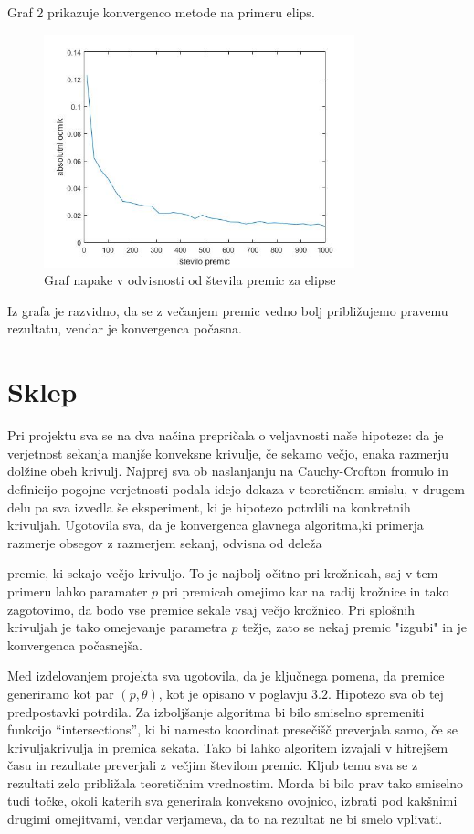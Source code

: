 \documentclass[a4paper]{article}
\begin{document}
Graf 2 prikazuje konvergenco metode na primeru elips.

\begin{figure}[h]
\centering
\includegraphics[width=90mm]{graf_elipsa2.jpg}
\caption{Graf napake v odvisnosti od števila premic za elipse \label{overflow}}
\end{figure} 


Iz grafa je razvidno, da se z večanjem premic vedno bolj približujemo pravemu rezultatu, vendar je konvergenca počasna. 

\section{Sklep}
Pri projektu sva se na dva načina prepričala o veljavnosti naše hipoteze: da je verjetnost sekanja manjše konveksne krivulje, če sekamo večjo, enaka razmerju dolžine obeh krivulj. Najprej sva ob naslanjanju na Cauchy-Crofton fromulo in definicijo pogojne verjetnosti podala idejo dokaza v teoretičnem smislu, v drugem delu pa sva izvedla še eksperiment, ki je hipotezo potrdili na konkretnih krivuljah. 
Ugotovila sva, da je konvergenca glavnega algoritma,ki primerja razmerje obsegov z razmerjem sekanj, odvisna od deleža

premic, ki sekajo večjo krivuljo. To je najbolj očitno pri krožnicah, saj v tem primeru lahko paramater $p$ pri premicah omejimo kar na radij krožnice in tako zagotovimo, da bodo vse premice sekale vsaj večjo krožnico. Pri splošnih krivuljah je tako omejevanje parametra $p$ težje, zato se nekaj premic "izgubi" in je konvergenca počasnejša. 

Med izdelovanjem projekta sva ugotovila, da je ključnega pomena, da premice generiramo kot par $(p, \theta)$, kot je opisano v poglavju $3.2$. Hipotezo sva ob tej predpostavki potrdila. Za izboljšanje algoritma bi bilo smiselno spremeniti funkcijo ``intersections'', ki bi namesto koordinat presečišč preverjala samo, če se krivuljakrivulja in premica sekata. Tako bi lahko algoritem izvajali v hitrejšem času in rezultate preverjali z večjim številom premic. Kljub temu sva se z rezultati zelo približala teoretičnim vrednostim. Morda bi bilo prav tako smiselno tudi točke, okoli katerih sva generirala konveksno ovojnico, izbrati pod kakšnimi drugimi omejitvami, vendar verjameva, da to na rezultat ne bi smelo vplivati.
\end{document}
